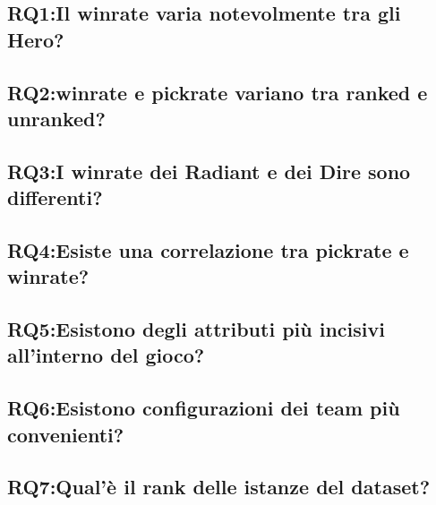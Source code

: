 \subsection{RQ1:Il winrate varia notevolmente tra gli Hero?}


\subsection{RQ2:winrate e pickrate variano tra ranked e unranked?}


\subsection{RQ3:I winrate dei Radiant e dei Dire sono differenti?}


\subsection{RQ4:Esiste una correlazione tra pickrate e winrate?}


\newpage
\subsection{RQ5:Esistono degli attributi più incisivi all'interno del gioco?}


\newpage
\subsection{RQ6:Esistono configurazioni dei team più convenienti?}


\subsection{RQ7:Qual'è il rank delle istanze del dataset?}


